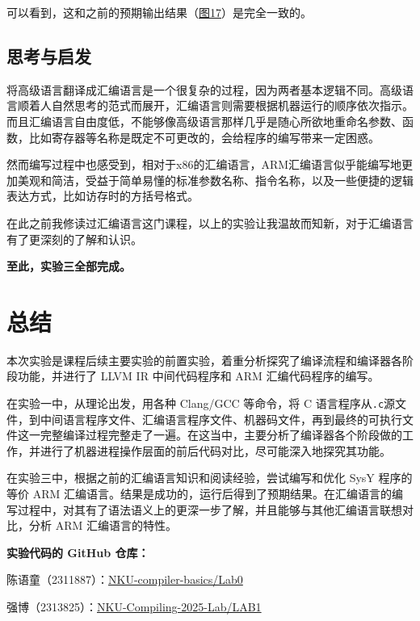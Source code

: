 \documentclass[UTF8,a4paper,10pt]{ctexart}
\begin{document}
可以看到，这和之前的预期输出结果（\hyperref[expectation]{图17}）是完全一致的。

\vspace{1em}

\subsection{思考与启发}
将高级语言翻译成汇编语言是一个很复杂的过程，因为两者基本逻辑不同。高级语言顺着人自然思考的范式而展开，汇编语言则需要根据机器运行的顺序依次指示。而且汇编语言自由度低，不能够像高级语言那样几乎是随心所欲地重命名参数、函数，比如寄存器等名称是既定不可更改的，会给程序的编写带来一定困惑。

然而编写过程中也感受到，相对于x86的汇编语言，ARM汇编语言似乎能编写地更加美观和简洁，受益于简单易懂的标准参数名称、指令名称，以及一些便捷的逻辑表达方式，比如访存时的方括号格式。

在此之前我修读过汇编语言这门课程，以上的实验让我温故而知新，对于汇编语言有了更深刻的了解和认识。

\vspace{1em}

\textbf{\large{至此，实验三全部完成。}}



\vspace{3em}

\section{总结}
本次实验是课程后续主要实验的前置实验，着重分析探究了编译流程和编译器各阶段功能，并进行了 LLVM IR 中间代码程序和 ARM 汇编代码程序的编写。

在实验一中，从理论出发，用各种 Clang/GCC 等命令，将 C 语言程序从\texttt{.c}源文件，到中间语言程序文件、汇编语言程序文件、机器码文件，再到最终的可执行文件这一完整编译过程完整走了一遍。在这当中，主要分析了编译器各个阶段做的工作，并进行了机器进程操作层面的前后代码对比，尽可能深入地探究其功能。

在实验三中，根据之前的汇编语言知识和阅读经验，尝试编写和优化 SysY 程序的等价 ARM 汇编语言。结果是成功的，运行后得到了预期结果。在汇编语言的编写过程中，对其有了语法语义上的更深一步了解，并且能够与其他汇编语言联想对比，分析 ARM 汇编语言的特性。

\vspace{2em}

\textbf{实验代码的 GitHub 仓库：}

陈语童（2311887）：\href{https://github.com/bugp3ssy666/NKU-compiler-basics/tree/main/Lab0}{NKU-compiler-basics/Lab0}

强博（2313825）：\href{https://github.com/RecA123/NKU-Compiling-2025-Lab/tree/main/LAB1}{NKU-Compiling-2025-Lab/LAB1}

\end{document}
